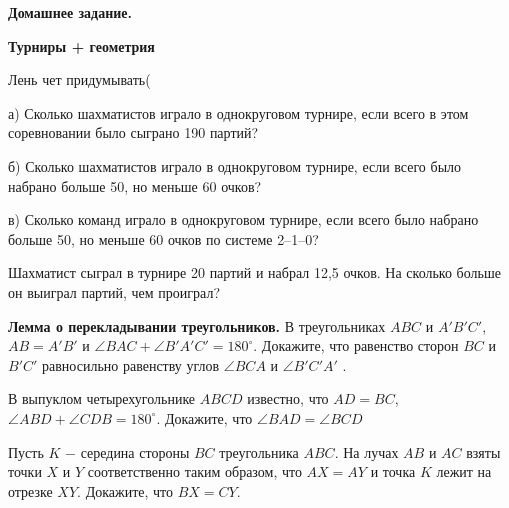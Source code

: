 \centerline{\bf \Huge Домашнее задание.}
\centerline{\bf \Huge Турниры + геометрия}

\begin{flushright}
        \scriptsize{Лень чет придумывать(}
\end{flushright}

а) Сколько шахматистов играло в однокруговом турнире, если всего в этом соревновании было сыграно 190 партий?

б) Сколько шахматистов играло в однокруговом турнире, если всего было набрано больше 50, но меньше 60 очков?

в) Сколько команд играло в однокруговом турнире, если всего было набрано больше 50, но меньше 60 очков по системе 2–1–0?

Шахматист сыграл в турнире 20 партий и набрал 12,5 очков. На сколько больше он выиграл партий, чем проиграл?

 \textbf{Лемма о перекладывании треугольников.} В треугольниках $ABC$ и $A'B'C'$, $AB = A'B'$ и $\angle BAC + \angle B'A'C' = 180^{\circ}$. Докажите, что равенство сторон $BC$ и $B'C'$ равносильно равенству углов $\angle BCA$ и $\angle B'C'A'$ .

 В выпуклом четырехугольнике $ABCD$ известно, что $AD=BC$, $\angle ABD + \angle CDB = 180^{\circ}$. Докажите, что $\angle BAD = \angle BCD$

 Пусть $K$ $-$ середина стороны $BC$ треугольника $ABC$. На лучах $AB$ и $AC$ взяты точки $X$ и $Y$ соответственно таким образом, что $AX = AY$ и точка $K$ лежит на отрезке $XY$. Докажите, что $BX = CY$.